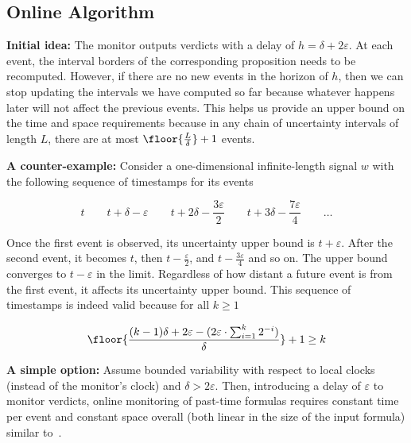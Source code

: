 \subsection*{Online Algorithm}
\textbf{Initial idea:}
The monitor outputs verdicts with a delay of $h = \delta + 2\varepsilon$.
At each event, the interval borders of the corresponding proposition needs to be recomputed.
However, if there are no new events in the horizon of $h$, then we can stop updating the intervals we have computed so far because whatever happens later will not affect the previous events.
This helps us provide an upper bound on the time and space requirements because in any chain of uncertainty intervals of length $L$, there are at most $\floor{\frac{L}{\delta}} + 1$ events.

\vspace{1em}
\noindent
\textbf{A counter-example:} Consider a one-dimensional infinite-length signal $w$ with the following sequence of timestamps for its events

$$ t \hspace{2em} t + \delta - \varepsilon \hspace{2em} t + 2\delta - \frac{3\varepsilon}{2} \hspace{2em} t + 3\delta - \frac{7\varepsilon}{4} \hspace{2em} \ldots $$

Once the first event is observed, its uncertainty upper bound is $t + \varepsilon$.
After the second event, it becomes $t$, then $t - \frac{\varepsilon}{2}$, and $t - \frac{3\varepsilon}{4}$ and so on.
The upper bound converges to $t - \varepsilon$ in the limit.
Regardless of how distant a future event is from the first event, it affects its uncertainty upper bound.
This sequence of timestamps is indeed valid because for all $k \geq 1$

$$ \floor{\frac{(k-1)\delta + 2\varepsilon - (2\varepsilon \cdot \sum_{i=1}^{k}2^{-i})}{\delta}} + 1 \geq k $$

\vspace{1em}
\noindent
\textbf{A simple option:}
Assume bounded variability with respect to local clocks (instead of the monitor's clock) and $\delta > 2\varepsilon$.
Then, introducing a delay of $\varepsilon$ to monitor verdicts, online monitoring of past-time formulas requires constant time per event and constant space overall (both linear in the size of the input formula) similar to~\cite{Havelund2002}.


